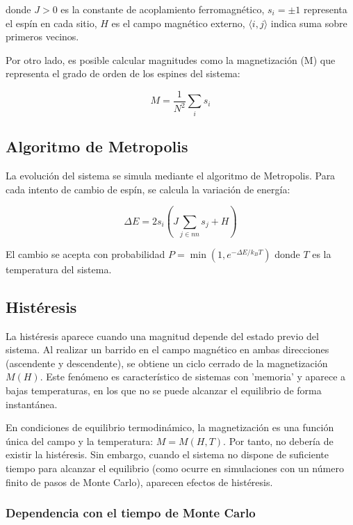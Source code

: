 \documentclass[12pt]{article}
\begin{document}
donde $J > 0$ es la constante de acoplamiento ferromagnético, $s_i = \pm 1$ representa el espín en cada sitio, $H$ es el campo magnético externo, $\langle i,j \rangle$ indica suma sobre primeros vecinos.

Por otro lado, es posible calcular magnitudes como la magnetización (M) que representa el grado de orden de los espines del sistema:

\begin{equation}
M = \frac{1}{N^2} \sum_i s_i
\end{equation}

\subsection{Algoritmo de Metropolis}

La evolución del sistema se simula mediante el algoritmo de Metropolis. Para cada intento de cambio de espín, se calcula la variación de energía:

\begin{equation}
\Delta E = 2 s_i \left( J \sum_{j \in nn} s_j + H \right)
\end{equation}

El cambio se acepta con probabilidad $P = \min \left(1, e^{-\Delta E / k_B T} \right)$ donde $T$ es la temperatura del sistema.

\subsection{Histéresis}
 
La histéresis aparece cuando una magnitud depende del estado previo del sistema. Al realizar un barrido en el campo magnético en ambas direcciones (ascendente y descendente), se obtiene un ciclo cerrado de la magnetización $M(H)$. Este fenómeno es característico de sistemas con 'memoria' y aparece a bajas temperaturas, en los que no se puede alcanzar el equilibrio de forma instantánea. 

En condiciones de equilibrio termodinámico, la magnetización es una función única del campo y la temperatura: $M = M(H, T)$. Por tanto, no debería de existir la histéresis. Sin embargo, cuando el sistema no dispone de suficiente tiempo para alcanzar el equilibrio (como ocurre en simulaciones con un número finito de pasos de Monte Carlo), aparecen efectos de histéresis.

\subsubsection{Dependencia con el tiempo de Monte Carlo}
\end{document}

